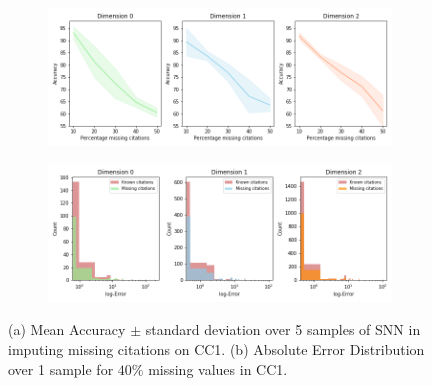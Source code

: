 \begin{figure}[tb]
\centering
 \begin{subfigure}[t]{-0.8\textwidth}
 \vspace{-4cm}
  \end{subfigure}
\begin{subfigure}[t]{0.8\textwidth}
\centering
   \includegraphics[scale=0.35]{./figures/accuracy_network1.png}
\end{subfigure}
 \begin{subfigure}[t]{0.8\textwidth}
  \end{subfigure}
\begin{subfigure}[t]{0.8\textwidth}
\centering
\vspace{-0.5cm}
   \includegraphics[scale=0.36]{./figures/Error_dist_start150250_seed6666_notsee40.png}
\end{subfigure}
\caption{(a) Mean Accuracy $\pm$ standard deviation over 5 samples of SNN in imputing missing citations on CC1. (b) Absolute Error Distribution over 1 sample for $40\%$ missing values in CC1.}
\label{fig:accuracy-error}
\end{figure}

